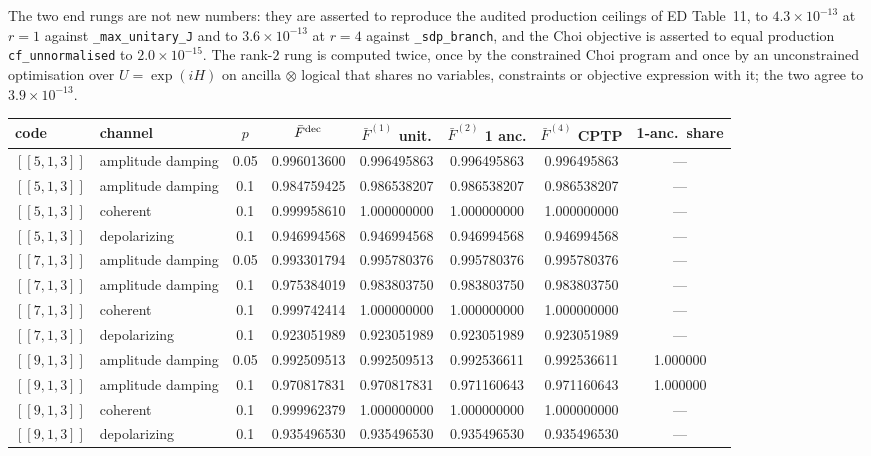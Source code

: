\documentclass[10pt,a4paper]{article}
\begin{document}
The two end rungs are not new numbers: they are asserted to reproduce the audited
production ceilings of ED Table~11, to $4.3\times 10^{-13}$ at $r{=}1$ against
\texttt{\_max\_unitary\_J} and to $3.6\times 10^{-13}$ at $r{=}4$ against \texttt{\_sdp\_branch},
and the Choi objective is asserted to equal production
\texttt{cf\_unnormalised} to $2.0\times 10^{-15}$.  The rank-$2$ rung is computed twice, once by the
constrained Choi program and once by an unconstrained optimisation over
$U=\exp(iH)$ on ancilla$\,\otimes\,$logical that shares no variables, constraints
or objective expression with it; the two agree to $3.9\times 10^{-13}$.
\begin{longtable}{llcccccc}
\toprule code & channel & $p$ & $\bar F^{\rm dec}$ & $\bar F^{(1)}$ unit. & $\bar F^{(2)}$ 1 anc. & $\bar F^{(4)}$ CPTP & 1-anc.\ share \\ \midrule
$[\![5,1,3]\!]$ & amplitude damping & 0.05 & 0.996013600 & 0.996495863 & 0.996495863 & 0.996495863 & --- \\
$[\![5,1,3]\!]$ & amplitude damping & 0.1 & 0.984759425 & 0.986538207 & 0.986538207 & 0.986538207 & --- \\
$[\![5,1,3]\!]$ & coherent & 0.1 & 0.999958610 & 1.000000000 & 1.000000000 & 1.000000000 & --- \\
$[\![5,1,3]\!]$ & depolarizing & 0.1 & 0.946994568 & 0.946994568 & 0.946994568 & 0.946994568 & --- \\
$[\![7,1,3]\!]$ & amplitude damping & 0.05 & 0.993301794 & 0.995780376 & 0.995780376 & 0.995780376 & --- \\
$[\![7,1,3]\!]$ & amplitude damping & 0.1 & 0.975384019 & 0.983803750 & 0.983803750 & 0.983803750 & --- \\
$[\![7,1,3]\!]$ & coherent & 0.1 & 0.999742414 & 1.000000000 & 1.000000000 & 1.000000000 & --- \\
$[\![7,1,3]\!]$ & depolarizing & 0.1 & 0.923051989 & 0.923051989 & 0.923051989 & 0.923051989 & --- \\
$[\![9,1,3]\!]$ & amplitude damping & 0.05 & 0.992509513 & 0.992509513 & 0.992536611 & 0.992536611 & 1.000000 \\
$[\![9,1,3]\!]$ & amplitude damping & 0.1 & 0.970817831 & 0.970817831 & 0.971160643 & 0.971160643 & 1.000000 \\
$[\![9,1,3]\!]$ & coherent & 0.1 & 0.999962379 & 1.000000000 & 1.000000000 & 1.000000000 & --- \\
$[\![9,1,3]\!]$ & depolarizing & 0.1 & 0.935496530 & 0.935496530 & 0.935496530 & 0.935496530 & --- \\
\bottomrule\end{longtable}
\end{document}
